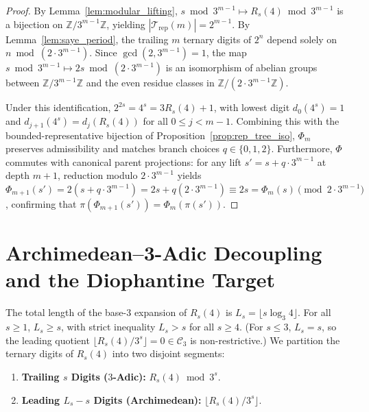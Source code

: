 \documentclass[11pt,reqno]{amsart}
\theoremstyle{plain}
\theoremstyle{definition}
\theoremstyle{remark}
\newcommand{\C}{\mathcal{C}}
\newcommand{\Z}{\mathbb{Z}}
\newcommand{\Trep}{\mathcal{T}_{\mathrm{rep}}}
\begin{document}
\begin{proof}
By Lemma~\ref{lem:modular_lifting}, $s \bmod 3^{m-1} \mapsto R_s(4) \bmod 3^{m-1}$ is a bijection on $\Z / 3^{m-1} \Z$, yielding $|\Trep(m)| = 2^{m-1}$. By Lemma~\ref{lem:saye_period}, the trailing $m$ ternary digits of $2^n$ depend solely on $n \bmod (2 \cdot 3^{m-1})$. Since $\gcd(2, 3^{m-1}) = 1$, the map $s \bmod 3^{m-1} \mapsto 2s \bmod (2 \cdot 3^{m-1})$ is an isomorphism of abelian groups between $\Z / 3^{m-1} \Z$ and the even residue classes in $\Z / (2 \cdot 3^{m-1} \Z)$.

Under this identification, $2^{2s} = 4^s = 3 R_s(4) + 1$, with lowest digit $d_0(4^s) = 1$ and $d_{j+1}(4^s) = d_j(R_s(4))$ for all $0 \le j < m-1$. Combining this with the bounded-representative bijection of Proposition~\ref{prop:rep_tree_iso}, $\Phi_m$ preserves admissibility and matches branch choices $q \in \{0, 1, 2\}$. Furthermore, $\Phi$ commutes with canonical parent projections: for any lift $s' = s + q \cdot 3^{m-1}$ at depth $m+1$, reduction modulo $2 \cdot 3^{m-1}$ yields $\Phi_{m+1}(s') = 2(s + q \cdot 3^{m-1}) = 2s + q(2 \cdot 3^{m-1}) \equiv 2s = \Phi_m(s) \pmod{2 \cdot 3^{m-1}}$, confirming that $\pi(\Phi_{m+1}(s')) = \Phi_m(\pi(s'))$.
\end{proof}

\section{Archimedean--3-Adic Decoupling and the Diophantine Target}\label{sec:decoupling}

The total length of the base-$3$ expansion of $R_s(4)$ is $L_s = \lfloor s \log_3 4 \rfloor$. For all $s \ge 1$, $L_s \ge s$, with strict inequality $L_s > s$ for all $s \ge 4$. (For $s \le 3$, $L_s = s$, so the leading quotient $\lfloor R_s(4)/3^s \rfloor = 0 \in \C_3$ is non-restrictive.) We partition the ternary digits of $R_s(4)$ into two disjoint segments:
\begin{enumerate}
    \item \textbf{Trailing $s$ Digits ($3$-Adic):} $R_s(4) \bmod 3^s$.
    \item \textbf{Leading $L_s - s$ Digits (Archimedean):} $\lfloor R_s(4) / 3^s \rfloor$.
\end{enumerate}
\end{document}
